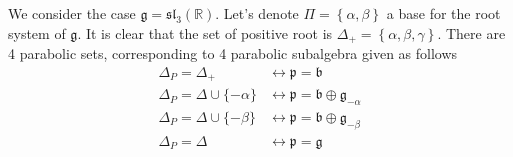 \begin{example}
    We consider the case $\mathfrak{g} = \mathfrak{sl}_3(\mathbb{R})$. Let's denote
    $\Pi = \left\lbrace \alpha,\beta\right\rbrace$ a base for the root system of $\mathfrak{g}$. It is clear that
    the set of positive root is $\Delta_+=\left\lbrace \alpha,\beta,\gamma \right\rbrace$. There are
    4 parabolic sets, corresponding to 4 parabolic subalgebra given as follows
    \begin{align*}
        \Delta_P = \Delta_+                 & \longleftrightarrow \mathfrak{p} = \mathfrak{b}                               \\
        \Delta_{P} =\Delta \cup \{-\alpha\} & \longleftrightarrow \mathfrak{p} = \mathfrak{b} \oplus \mathfrak{g}_{-\alpha} \\
        \Delta_{P}= \Delta \cup \{-\beta\}  & \longleftrightarrow \mathfrak{p} = \mathfrak{b} \oplus \mathfrak{g}_{-\beta}  \\
        \Delta_P= \Delta                    & \longleftrightarrow \mathfrak{p} = \mathfrak{g}
    \end{align*}
\end{example}

